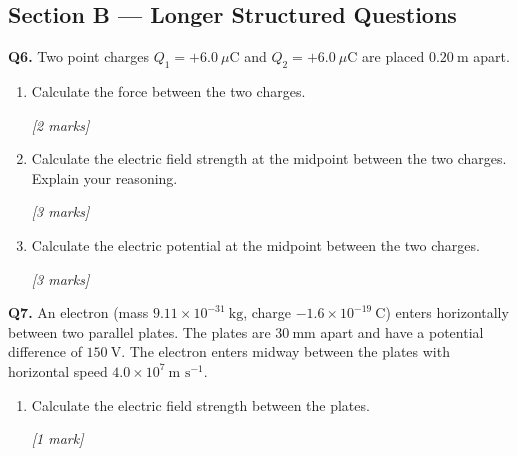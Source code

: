 \subsection*{Section B — Longer Structured Questions}

\begin{tcolorbox}[colback=white, colframe=midblue, breakable]

\begin{minipage}{\linewidth}
\textbf{Q6.} Two point charges $Q_1 = +6.0\ \mu\text{C}$ and $Q_2 = +6.0\ \mu\text{C}$ are placed $0.20\ \text{m}$ apart.
\end{minipage}

\begin{enumerate}[label=(\alph*)]
  \item \begin{minipage}[t]{\linewidth}
  Calculate the force between the two charges.
  \par\hfill\textit{[2 marks]}
  \vspace{3cm}
  \end{minipage}

  \item \begin{minipage}[t]{\linewidth}
  Calculate the electric field strength at the midpoint between the two charges. Explain your reasoning.
  \par\hfill\textit{[3 marks]}
  \vspace{3.5cm}
  \end{minipage}

  \item \begin{minipage}[t]{\linewidth}
  Calculate the electric potential at the midpoint between the two charges.
  \par\hfill\textit{[3 marks]}
  \vspace{3.5cm}
  \end{minipage}
\end{enumerate}

\begin{minipage}{\linewidth}
\textbf{Q7.} An electron (mass $9.11\times10^{-31}\ \text{kg}$, charge $-1.6\times10^{-19}\ \text{C}$) enters horizontally between two parallel plates. The plates are $30\ \text{mm}$ apart and have a potential difference of $150\ \text{V}$. The electron enters midway between the plates with horizontal speed $4.0\times10^7\ \text{m s}^{-1}$.

\begin{enumerate}[label=(\alph*)]
  \item Calculate the electric field strength between the plates.
  \par\hfill\textit{[1 mark]}
  \vspace{2cm}


\end{enumerate}
\end{minipage}
\end{tcolorbox}
